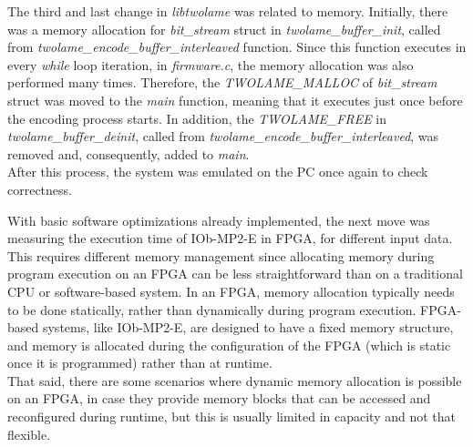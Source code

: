 The third and last change in \textit{libtwolame} was related to memory.
Initially, there was a memory allocation for \textit{bit\_stream} struct in \textit{twolame\_buffer\_init}, called from \textit{twolame\_encode\_buffer\_interleaved} function. Since this function executes in every \textit{while} loop iteration, in \textit{firmware.c}, the memory allocation was also performed many times.
Therefore, the \textit{TWOLAME\_MALLOC} of \textit{bit\_stream} struct was moved to the \textit{main} function, meaning that it executes just once before the encoding process starts.
In addition, the \textit{TWOLAME\_FREE} in \textit{twolame\_buffer\_deinit}, called from \textit{twolame\_encode\_buffer\_interleaved}, was removed and, consequently, added to \textit{main}.\\
After this process, the system was emulated on the PC once again to check correctness.

With basic software optimizations already implemented, the next move was measuring the execution time of IOb-MP2-E in FPGA, for different input data. 
This requires different memory management since allocating memory during program execution on an FPGA can be less straightforward than on a traditional CPU or software-based system. In an FPGA, memory allocation typically needs to be done statically, rather than dynamically during program execution. FPGA-based systems, like IOb-MP2-E, are designed to have a fixed memory structure, and memory is allocated during the configuration of the FPGA (which is static once it is programmed) rather than at runtime.\\
That said, there are some scenarios where dynamic memory allocation is possible on an FPGA, in case they provide memory blocks that can be accessed and reconfigured during runtime, but this is usually limited in capacity and not that flexible.

